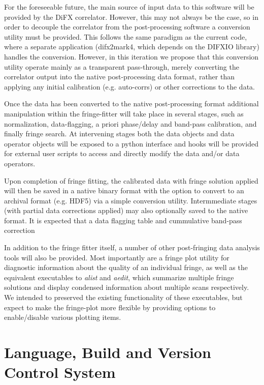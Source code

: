 \documentclass[hidelinks]{article}
\let\Oldsection\section
\renewcommand{\section}{\FloatBarrier\Oldsection}
\begin{document}
For the foreseeable future, the main source of input data to this software will be provided by the DiFX correlator. However, this may not always
be the case, so in order to decouple the correlator from the post-processing software a conversion utility must be provided. This follows
the same paradigm as the current code, where a separate application (difx2mark4, which depends on the DIFXIO library) handles the conversion. However,
in this iteration we propose that this conversion utility operate mainly as a transparent pass-through, merely
converting the correlator output into the native post-processing data format, rather than applying any initial calibration (e.g. auto-corrs) or
other corrections to the data.

Once the data has been converted to the native post-processing format additional manipulation within the fringe-fitter will take place in several stages, such as normalization, data-flagging, a priori phase/delay and band-pass calibration, and finally fringe search. At intervening stages
both the data objects and data operator objects will be exposed to a python interface and hooks will be provided for external user scripts to 
access and directly modify the data and/or data operators.

Upon completion of fringe fitting, the calibrated data with fringe solution applied will then be saved in a native binary format with the option to convert to an archival format (e.g. HDF5) via a simple conversion utility. Intermmediate stages (with partial data corrections applied) may also optionally saved to the native format. It is expected that a data flagging table and cummulative band-pass correction

In addition to the fringe fitter itself, a number of other post-fringing data analysis tools will also be provided. Most importantly are
a fringe plot utility for diagnostic information about the quality of an individual fringe, as well as the equivalent executables to \textit{alist} and \textit{aedit}, which summarize multiple fringe solutions and display condensed information about multiple scans respectively.
We intended to preserved the existing functionality of these executables, but expect to make the fringe-plot more flexible by providing options
to enable/disable various plotting items.


\section{Language, Build and Version Control System}
\end{document}
